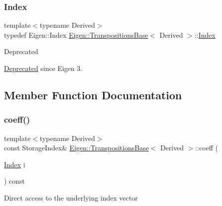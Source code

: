 \subsubsection{\texorpdfstring{Index}{Index}}
{\footnotesize\ttfamily template$<$typename Derived$>$ \\
typedef Eigen\+::\+Index \mbox{\hyperlink{class_eigen_1_1_transpositions_base}{Eigen\+::\+Transpositions\+Base}}$<$ Derived $>$\+::\mbox{\hyperlink{class_eigen_1_1_transpositions_base_a3f5f06118b419e8e6ccbe49ed5b4c91f}{Index}}}

\begin{DoxyRefDesc}{Deprecated}
\item[\mbox{\hyperlink{deprecated__deprecated000008}{Deprecated}}]since Eigen 3. \end{DoxyRefDesc}


\subsection{Member Function Documentation}
\mbox{\label{class_eigen_1_1_transpositions_base_aae1d3847b107e518c9f2b6010a6b635a}} 
\subsubsection{\texorpdfstring{coeff()}{coeff()}}
{\footnotesize\ttfamily template$<$typename Derived$>$ \\
const Storage\+Index\& \mbox{\hyperlink{class_eigen_1_1_transpositions_base}{Eigen\+::\+Transpositions\+Base}}$<$ Derived $>$\+::coeff (\begin{DoxyParamCaption}\item[{\mbox{\hyperlink{class_eigen_1_1_transpositions_base_a3f5f06118b419e8e6ccbe49ed5b4c91f}{Index}}}]{i }\end{DoxyParamCaption}) const\hspace{0.3cm}{\ttfamily [inline]}}

Direct access to the underlying index vector \mbox{\label{class_eigen_1_1_transpositions_base_a97dda1bb4ff8bdd83d8e97af3e590252}} 
